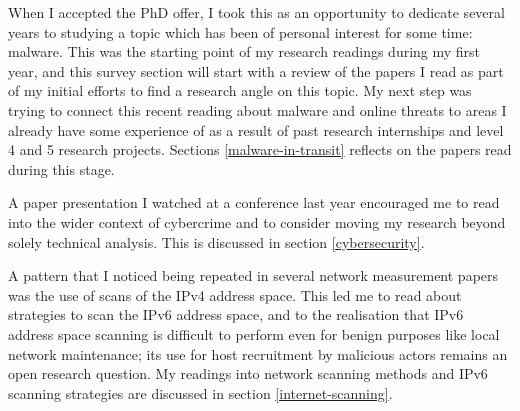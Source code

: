 \documentclass[10pt,sigconf]{acmart}
\begin{document}
When I accepted the PhD offer, I took this as an opportunity to dedicate several years to studying a topic which has been of personal interest for some time: malware.
This was the starting point of my research readings during my first year, and this survey section will start with a review of the papers I read as part of my initial efforts to find a research angle on this topic.
My next step was trying to connect this recent reading about malware and online threats to areas I already have some experience of as a result of past research internships and level 4 and 5 research projects.
Sections \ref{malware-in-transit} reflects on the papers read during this stage.

A paper presentation I watched at a conference last year encouraged me to read into the wider context of cybercrime and to consider moving my research beyond solely technical analysis.
This is discussed in section \ref{cybersecurity}.

A pattern that I noticed being repeated in several network measurement papers was the use of scans of the IPv4 address space.
This led me to read about strategies to scan the IPv6 address space, and to the realisation that IPv6 address space scanning is difficult to perform even for benign purposes like local network maintenance;
its use for host recruitment by malicious actors remains an open research question.
My readings into network scanning methods and IPv6 scanning strategies are discussed in section \ref{internet-scanning}.
\end{document}
